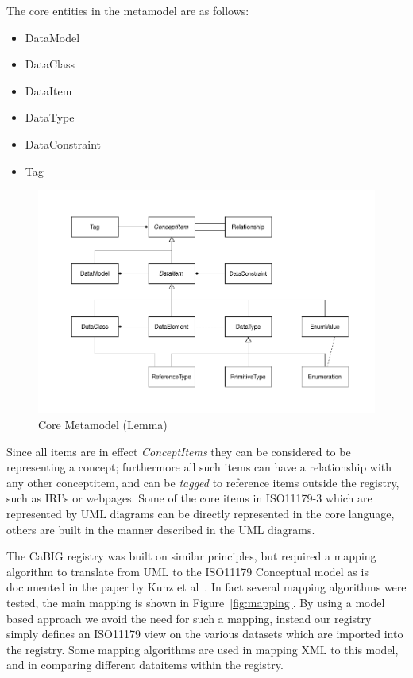 \documentclass{llncs}
\begin{document}
The core entities in the metamodel are as follows:
\begin{itemize}
\item DataModel
\item DataClass
\item DataItem
\item DataType
\item DataConstraint
\item Tag
\end{itemize}

\begin{figure}[h]
\includegraphics[width=1.0\textwidth,natwidth=610,natheight=642]{LemmaCore1}
\caption{Core Metamodel (Lemma)} 
\label{fig:lemma}
\end{figure}

Since all items are in effect \emph{ConceptItems} they can be considered to be representing a concept; furthermore all such items can have a relationship with any other conceptitem, and can be \emph{tagged} to reference items outside the registry, such as IRI's or webpages. Some of the core items in ISO11179-3 which are represented by UML diagrams can be directly represented in the core language, others are built in the manner described in the UML diagrams. 

The CaBIG registry was built on similar principles, but required a mapping algorithm to translate from UML to the ISO11179 Conceptual model as is documented in the paper by Kunz et al~\cite{Kunz2009}. In fact several mapping algorithms were tested, the main mapping is shown in Figure~\ref{fig:mapping}. By using a model based approach we avoid the need for such a mapping, instead our registry simply defines an ISO11179 view on the various datasets which are imported into the registry.  Some mapping algorithms are used in mapping XML to this model, and in comparing different dataitems within the registry.
\end{document}
